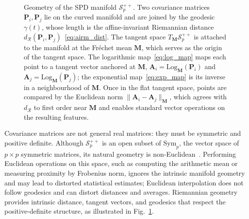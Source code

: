 \begin{figure}[!t]
  \caption{Geometry of the SPD manifold $\mathcal{S}^{++}_p$. Two covariance
  matrices $\mathbf{P}_i,\mathbf{P}_j$ lie on the curved manifold and are joined
  by the geodesic $\gamma(t)$, whose length is the affine-invariant Riemannian
  distance $d_\mathcal{R}(\mathbf{P}_i,\mathbf{P}_j)$~\eqref{eq:airm_dist}. The
  tangent space $T_{\mathbf{M}}\mathcal{S}^{++}_p$ is attached to the manifold at
  the Fréchet mean $\mathbf{M}$, which serves as the origin of the tangent space.
  The logarithmic map~\eqref{eq:log_map} maps each point to a tangent vector
  anchored at $\mathbf{M}$,
  $\mathbf{A}_i=\mathrm{Log}_{\mathbf{M}}(\mathbf{P}_i)$ and
  $\mathbf{A}_j=\mathrm{Log}_{\mathbf{M}}(\mathbf{P}_j)$; the exponential
  map~\eqref{eq:exp_map} is its inverse in a neighbourhood of $\mathbf{M}$. Once
  in the flat tangent space, points are compared by the Euclidean norm
  $\|\mathbf{A}_i-\mathbf{A}_j\|_{\mathbf{M}}$, which agrees with
  $d_\mathcal{R}$ to first order near $\mathbf{M}$ and enables standard vector
  operations on the resulting features.}
  \label{fig:manifold}
\end{figure}

Covariance matrices are not general real matrices: they must be symmetric and
positive definite.
Although $\mathcal{S}^{++}_p$ is an open subset of $\mathrm{Sym}_p$, the vector
space of $p\times p$ symmetric matrices, its natural geometry is
non-Euclidean~\cite{pennec2006riemannian,bhatia2009positive}.
Performing Euclidean operations on this space, such as computing the arithmetic
mean or measuring proximity by Frobenius norm, ignores the intrinsic manifold
geometry and may lead to distorted statistical estimates; Euclidean interpolation
does not follow geodesics and can distort distances and averages.
Riemannian geometry provides intrinsic distance, tangent vectors, and geodesics
that respect the positive-definite structure, as illustrated in
Fig.~\ref{fig:manifold}.

